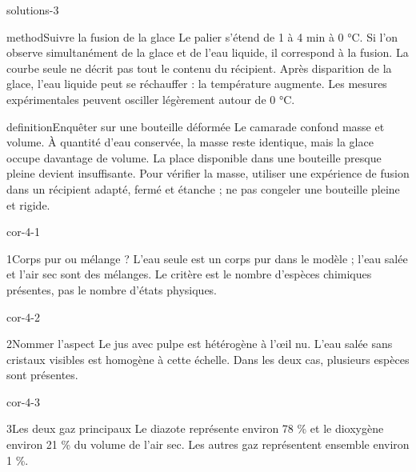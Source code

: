 \documentclass[12pt,twoside,openany]{book}
\begin{document}
\begin{pcFiche}{solutions-3}
\begin{pcEncadre}{method}{Suivre la fusion de la glace}
Le palier s’étend de 1 à 4 min à 0 °C. Si l’on observe simultanément de la glace et de l’eau liquide, il correspond à la fusion. La courbe seule ne décrit pas tout le contenu du récipient. Après disparition de la glace, l’eau liquide peut se réchauffer : la température augmente. Les mesures expérimentales peuvent osciller légèrement autour de 0 °C.\par
\end{pcEncadre}
\label{defi-cor-3}
\begin{pcEncadre}{definition}{Enquêter sur une bouteille déformée}
Le camarade confond masse et volume. À quantité d’eau conservée, la masse reste identique, mais la glace occupe davantage de volume. La place disponible dans une bouteille presque pleine devient insuffisante. Pour vérifier la masse, utiliser une expérience de fusion dans un récipient adapté, fermé et étanche ; ne pas congeler une bouteille pleine et rigide.\par
\end{pcEncadre}
\end{pcFiche}
\clearpage{}
\begin{blocLivre}{cor-4-1}
\begin{corrige}{1}{Corps pur ou mélange ?}
L’eau seule est un corps pur dans le modèle ; l’eau salée et l’air sec sont des mélanges. Le critère est le nombre d’espèces chimiques présentes, pas le nombre d’états physiques.\par
\end{corrige}\end{blocLivre}
\begin{blocLivre}{cor-4-2}
\begin{corrige}{2}{Nommer l’aspect}
Le jus avec pulpe est hétérogène à l’œil nu. L’eau salée sans cristaux visibles est homogène à cette échelle. Dans les deux cas, plusieurs espèces sont présentes.\par
\end{corrige}\end{blocLivre}
\begin{blocLivre}{cor-4-3}
\begin{corrige}{3}{Les deux gaz principaux}
Le diazote représente environ 78 \% et le dioxygène environ 21 \% du volume de l’air sec. Les autres gaz représentent ensemble environ 1 \%.\par
\end{corrige}\end{blocLivre}
\end{document}
